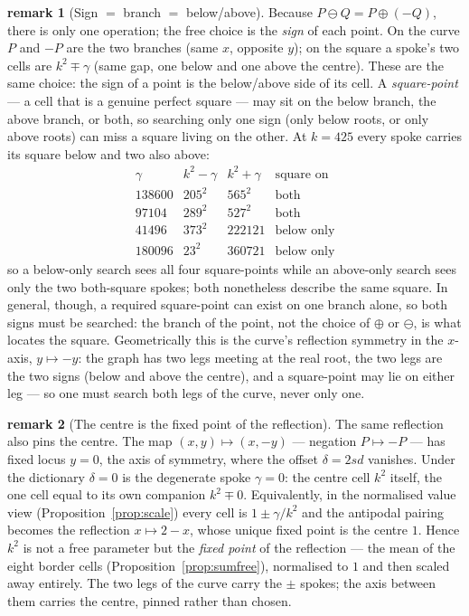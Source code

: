 \documentclass[11pt]{article}
\theoremstyle{definition}
\newtheorem{remark}{remark}
\begin{document}
\begin{remark}[Sign $=$ branch $=$ below/above]\label{rem:signbranch}
Because $P\ominus Q=P\oplus(-Q)$, there is only one operation; the free choice is the
\emph{sign} of each point. On the curve $P$ and $-P$ are the two branches (same $x$,
opposite $y$); on the square a spoke's two cells are $k^{2}\mp\gamma$ (same gap, one
below and one above the centre). These are the same choice: the sign of a point is the
below/above side of its cell. A \emph{square-point} --- a cell that is a genuine
perfect square --- may sit on the below branch, the above branch, or both, so searching
only one sign (only below roots, or only above roots) can miss a square living on the
other. At $k=425$ every spoke carries its square below and two also above:
\[
\begin{array}{r|cc|c}
\gamma & k^{2}-\gamma & k^{2}+\gamma & \text{square on}\\\hline
138600 & 205^{2} & 565^{2} & \text{both}\\
 97104 & 289^{2} & 527^{2} & \text{both}\\
 41496 & 373^{2} & 222121 & \text{below only}\\
180096 &  23^{2} & 360721 & \text{below only}
\end{array}
\]
so a below-only search sees all four square-points while an above-only search sees only
the two both-square spokes; both nonetheless describe the same square. In general,
though, a required square-point can exist on one branch alone, so both signs must be
searched: the branch of the point, not the choice of $\oplus$ or $\ominus$, is what
locates the square. Geometrically this is the curve's reflection symmetry in the
$x$-axis, $y\mapsto-y$: the graph has two legs meeting at the real root, the two legs
are the two signs (below and above the centre), and a square-point may lie on either
leg --- so one must search both legs of the curve, never only one.
\end{remark}

\begin{remark}[The centre is the fixed point of the reflection]\label{rem:centrefixed}
The same reflection also pins the centre. The map $(x,y)\mapsto(x,-y)$ --- negation
$P\mapsto -P$ --- has fixed locus $y=0$, the axis of symmetry, where the offset
$\delta=2sd$ vanishes. Under the dictionary $\delta=0$ is the degenerate spoke
$\gamma=0$: the centre cell $k^{2}$ itself, the one cell equal to its own companion
$k^{2}\mp0$. Equivalently, in the normalised value view
(Proposition~\ref{prop:scale}) every cell is $1\pm\gamma/k^{2}$ and the antipodal
pairing becomes the reflection $x\mapsto 2-x$, whose unique fixed point is the centre
$1$. Hence $k^{2}$ is not a free parameter but the \emph{fixed point} of the
reflection --- the mean of the eight border cells
(Proposition~\ref{prop:sumfree}), normalised to $1$ and then scaled away entirely.
The two legs of the curve carry the $\pm$ spokes; the axis between them carries the
centre, pinned rather than chosen.
\end{remark}
\end{document}
